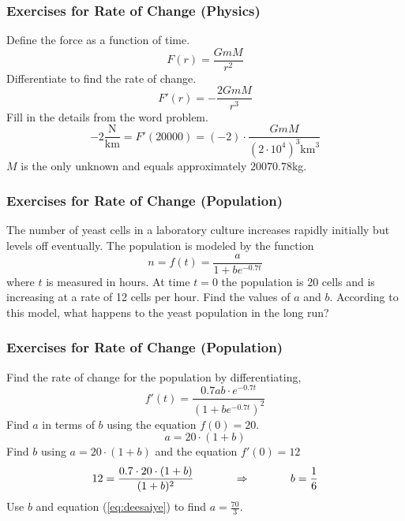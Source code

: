 \documentclass[xcolor=dvipsnames]{beamer}
\begin{document}
\begin{frame}
  \frametitle{Exercises for Rate of Change (Physics)}
  Define the force as a function of time.
  \begin{equation}
    \label{eq:ohseesie}
    F(r)=\frac{GmM}{r^{2}}
  \end{equation}
  Differentiate to find the rate of change.
  \begin{equation}
    \label{eq:eiphaila}
    F'(r)=-\frac{2GmM}{r^{3}}
  \end{equation}
  Fill in the details from the word problem.
  \begin{equation}
    \label{eq:luzielee}
    -2\frac{\mbox{N}}{\mbox{km}}=F'(20000)=(-2)\cdot\frac{GmM}{\left(2\cdot{}10^{4}\right)^{3}\mbox{km}^{3}}
  \end{equation}
  $M$ is the only unknown and equals approximately $20070.78$kg.
\end{frame}

\begin{frame}
  \frametitle{Exercises for Rate of Change (Population)}
The number of yeast cells in a laboratory culture increases rapidly
initially but levels off eventually. The population is modeled by the
function
\begin{equation}
  \label{eq:kupeivae}
  n=f(t)=\frac{a}{1+be^{-0.7t}}
\end{equation}
where $t$ is measured in hours. At time $t=0$ the population is 20
cells and is increasing at a rate of 12 cells per hour. Find the
values of $a$ and $b$. According to this model, what happens to the
yeast population in the long run?
\end{frame}

\begin{frame}
  \frametitle{Exercises for Rate of Change (Population)}
  Find the rate of change for the population by differentiating,
  \begin{equation}
    \label{eq:mohvuthe}
    f'(t)=\frac{0.7ab\cdot{}e^{-0.7t}}{\left(1+be^{-0.7t}\right)^{2}}
  \end{equation}
  Find $a$ in terms of $b$ using the equation $f(0)=20$.
  \begin{equation}
    \label{eq:deesaiye}
    a=20\cdot(1+b)
  \end{equation}
  Find $b$ using $a=20\cdot(1+b)$ and the equation $f'(0)=12$
  \begin{equation}
    \label{eq:oozeeroj}
    12=\frac{0.7\cdot{}20\cdot(1+b)}{(1+b)^{2}}\hspace{.5in}\Rightarrow\hspace{.5in}b=\frac{1}{6}
  \end{equation}
Use $b$ and equation (\ref{eq:deesaiye}) to find $a=\frac{70}{3}$. 
\end{frame}
\end{document}
